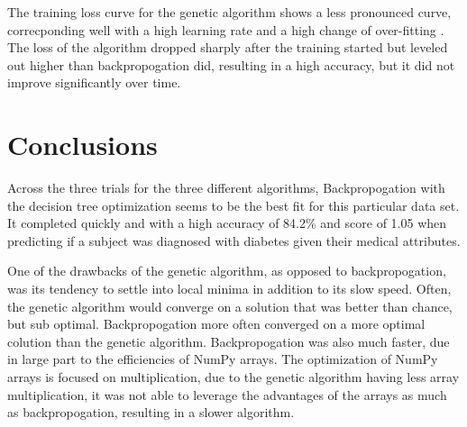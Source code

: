 \documentclass[12pt]{article}
\begin{document}
    \pagebreak

    The training loss curve for the genetic algorithm shows a less pronounced curve, correcponding well with a high
    learning rate and a high change of over-fitting \cite{goodLoss}.  The loss of the algorithm dropped sharply after the 
    training started but leveled out higher than
    backpropogation did, resulting in a high accuracy, but it did not improve significantly over time.
\section{Conclusions}
    Across the three trials for the three different algorithms, Backpropogation with the decision tree optimization
    seems to be the best fit for this particular data set.  It completed quickly and with a high accuracy of 84.2\% 
    and score of 1.05 when predicting if a subject was diagnosed with diabetes given their medical attributes.  

    One of the drawbacks of the genetic algorithm, as opposed to
    backpropogation, was its tendency to settle into local minima in addition to its slow speed.  Often, the genetic algorithm would converge
    on a solution that was better than chance, but sub optimal.  Backpropogation more often converged on a more optimal colution
    than the genetic algorithm.  Backpropogation was also much faster, due in large part to the efficiencies of NumPy
    arrays.  The optimization of NumPy arrays is focused on multiplication, due to the genetic algorithm having less array multiplication,
    it was not able to leverage the advantages of the arrays as much as backpropogation, resulting in a slower algorithm.

\pagebreak


\end{document}
